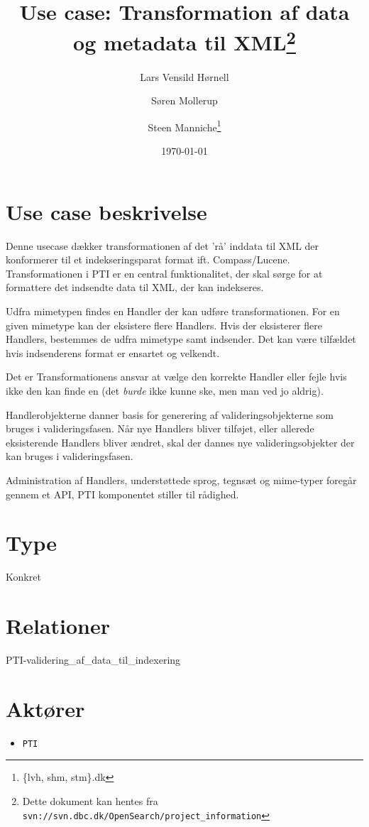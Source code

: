 \documentclass{article}
\author{Lars Vensild Hørnell \and Søren Mollerup \and Steen
  Manniche\thanks{\{lvh, shm, stm\}\@dbc.dk}}
\date{\today}
\title{Use case: Transformation af data og metadata til XML\thanks{Dette dokument kan hentes fra \texttt{svn://svn.dbc.dk/OpenSearch/project\_information}}}
\begin{document}
\maketitle

\newpage

\tableofcontents

\section{Use case beskrivelse}
Denne usecase dækker transformationen af det 'rå' inddata til XML der
konformerer til et indekseringsparat format ift. Compass/Lucene.
Transformationen i PTI er en central funktionalitet, der skal sørge
for at formattere det indsendte data til XML, der kan indekseres.

Udfra mimetypen findes en Handler der kan udføre transformationen. For
en given mimetype kan der eksistere flere Handlers. Hvis der
eksisterer flere Handlers, bestemmes de udfra mimetype samt
indsender. Det kan være tilfældet hvis indsenderens format er ensartet
og velkendt.

Det er Transformationens ansvar at vælge den korrekte Handler eller
fejle hvis ikke den kan finde en (det \textit{burde} ikke kunne ske,
men man ved jo aldrig).

Handlerobjekterne danner basis for generering af valideringsobjekterne
som bruges i valideringsfasen. Når nye Handlers bliver tilføjet, eller
allerede eksisterende Handlers bliver ændret, skal der dannes nye
valideringsobjekter der kan bruges i valideringsfasen.

Administration af Handlers, understøttede sprog, tegnsæt og mime-typer
foregår gennem et API, PTI komponentet stiller til rådighed.

\section{Type}
Konkret

\section{Relationer}
PTI-validering\_af\_data\_til\_indexering


\section{Aktører}
\begin{itemize}
\item \texttt{PTI}
\end{itemize}
\end{document}
